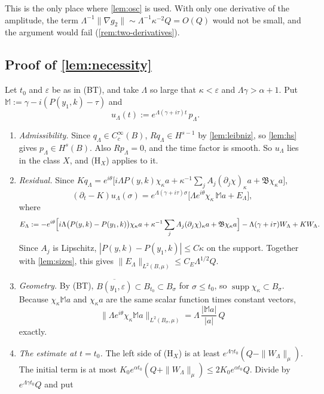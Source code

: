 \documentclass[11pt]{article}
\theoremstyle{plain}
\theoremstyle{definition}
\theoremstyle{remark}
\begin{document}
This is the only place where \cref{lem:osc} is used. With only one derivative of the amplitude, the term $\Lambda^{-1}\|\nabla g_2\| \sim \Lambda^{-1}\kappa^{-2}Q = O(Q)$ would not be small, and the argument would fail (\cref{rem:two-derivatives}).

\subsection{Proof of \texorpdfstring{\cref{lem:necessity}}{the necessity lemma}}\label{app:r1-proof}

Let $t_0$ and $\varepsilon$ be as in (BT), and take $\Lambda$ so large that $\kappa < \varepsilon$ and $\Lambda\gamma > \alpha + 1$. Put $\mathbb M := \gamma - i(P(y_1,k) - \tau)$ and
\[
  u_\Lambda(t) := e^{\Lambda(\gamma + i\tau)t}\,p_\Lambda .
\]
\begin{enumerate}
  \item \emph{Admissibility.} Since $q_\Lambda \in C^\infty_c(B)$, $Rq_\Lambda \in H^{s-1}$ by \cref{lem:leibniz}, so \cref{lem:hs} gives $p_\Lambda \in H^s(B)$. Also $Rp_\Lambda = 0$, and the time factor is smooth. So $u_\Lambda$ lies in the class $X$, and (H$_X$) applies to it.
  \item \emph{Residual.} Since $Kq_\Lambda = e^{i\theta}\bigl[i\Lambda P(y,k)\chi_\kappa a + \kappa^{-1}\sum_jA_j(\partial_j\chi)_\kappa a + \mathfrak B\chi_\kappa a\bigr]$,
  \[
    (\partial_t - K)u_\Lambda(\sigma) = e^{\Lambda(\gamma+i\tau)\sigma}\bigl[\Lambda e^{i\theta}\chi_\kappa\,\mathbb Ma + E_\Lambda\bigr],
  \]
  where
  \[
    E_\Lambda := -e^{i\theta}\Bigl[i\Lambda\bigl(P(y,k) - P(y_1,k)\bigr)\chi_\kappa a + \kappa^{-1}\sum_jA_j(\partial_j\chi)_\kappa a + \mathfrak B\chi_\kappa a\Bigr] - \Lambda(\gamma + i\tau)W_\Lambda + KW_\Lambda .
  \]
  Since $A_j$ is Lipschitz, $|P(y,k) - P(y_1,k)| \le C\kappa$ on the support. Together with \cref{lem:sizes}, this gives $\|E_\Lambda\|_{L^2(B,\mu)} \le C_E\Lambda^{1/2}Q$.
  \item \emph{Geometry.} By (BT), $\overline{B(y_1,\varepsilon)} \subset B_{t_0} \subset B_\sigma$ for $\sigma \le t_0$, so $\operatorname{supp}\chi_\kappa \subset B_\sigma$. Because $\chi_\kappa\mathbb Ma$ and $\chi_\kappa a$ are the same scalar function times constant vectors,
  \[
    \|\Lambda e^{i\theta}\chi_\kappa\mathbb Ma\|_{L^2(B_\sigma,\mu)} = \Lambda\,\frac{|\mathbb Ma|}{|a|}\,Q
  \]
  exactly.
  \item \emph{The estimate at $t = t_0$.} The left side of (H$_X$) is at least $e^{\Lambda\gamma t_0}(Q - \|W_\Lambda\|_\mu)$. The initial term is at most $K_0e^{\alpha t_0}(Q + \|W_\Lambda\|_\mu) \le 2K_0e^{\alpha t_0}Q$. Divide by $e^{\Lambda\gamma t_0}Q$ and put

\end{enumerate}
\end{document}
